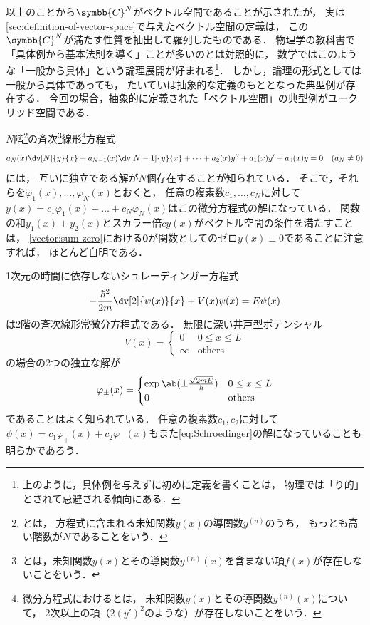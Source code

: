 \documentclass[
]{sotsu}
\begin{document}
以上のことから$\symbb{C}^N$がベクトル空間であることが示されたが，
実は\cref{sec:definition-of-vector-space}で与えたベクトル空間の定義は，
この$\symbb{C}^N$が満たす性質を抽出して羅列したものである．
物理学の教科書で「具体例から基本法則を導く」ことが多いのとは対照的に，
数学ではこのような「一般から具体」という論理展開が好まれる\footnote{
    上のように，具体例を与えずに初めに定義を書くことは，
    物理では「り的」とされて忌避される傾向にある．
}．
しかし，論理の形式としては一般から具体であっても，
たいていは抽象的な定義のもととなった典型例が存在する．
今回の場合，抽象的に定義された「ベクトル空間」の典型例がユークリッド空間である．


\quad
$N$階\footnote{
    とは，
    方程式に含まれる未知関数$y(x)$の導関数$y^{(n)}$のうち，
    もっとも高い階数が$N$であることをいう．
}の斉次\footnote{
    とは，未知関数$y(x)$とその導関数$y^{(n)} (x)$を含まない項$f(x)$が存在しないことをいう．
}線形\footnote{
    微分方程式におけるとは，
    未知関数$y(x)$とその導関数$y^{(n)} (x)$について，
    2次以上の項（$2 (y')^2$のような）が存在しないことをいう．
}方程式
\begin{equation}
    \label{eq:N-differential-equation}
    a_N (x) \dv[N]{y}{x} + a_{N-1} (x) \dv[N-1]{y}{x}
        + \dots + a_2 (x) y'' + a_1 (x) y' + a_0 (x) y = 0
    \quad (a_N \neq 0)
\end{equation}
には，
互いに独立である解が$N$個存在することが知られている．
そこで，それらを$\varphi_1 (x), \dots, \varphi_N (x)$とおくと，
任意の複素数$c_1, \dots, c_N$に対して$y(x) = c_1 \varphi_1 (x) + \dots + c_N \varphi_N (x)$はこの微分方程式の解になっている．
関数の和$y_1 (x) + y_2 (x)$とスカラー倍$c y(x)$がベクトル空間の条件を満たすことは，
\cref{vector:sum-zero}における$\symbf{0}$が関数としてのゼロ$y(x) \equiv 0$であることに注意すれば，
ほとんど自明である．

1次元の時間に依存しないシュレーディンガー方程式
\begin{equation}
    \label{eq:Schroedinger}
    -\frac{\hbar^2}{2m} \dv[2]{\psi(x)}{x} + V(x) \psi(x) = E \psi(x)
\end{equation}
は2階の斉次線形常微分方程式である．
無限に深い井戸型ポテンシャル
\begin{equation*}
    V(x) = 
    \begin{cases}
        0      &  0 \leq x \leq L  \\
        \infty &  \text{others}
    \end{cases}
\end{equation*}
の場合の2つの独立な解が
\begin{equation*}
    \varphi_{\pm} (x) = 
    \begin{cases}
        \exp \ab(\pm \frac{\sqrt{2 m E}}{\hbar})  &  0 \leq x \leq L  \\
        0  &  \text{others}
    \end{cases}
\end{equation*}
であることはよく知られている．
任意の複素数$c_1, c_2$に対して$\psi(x) = c_1 \varphi_{+} (x) + c_2 \varphi_{-} (x)$もまた\cref{eq:Schroedinger}の解になっていることも明らかであろう．
\end{document}
